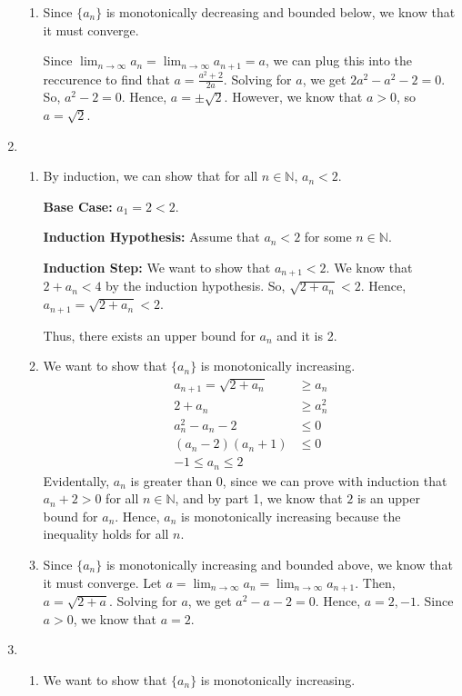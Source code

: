 \documentclass[12pt]{article}
\begin{document}
\begin{enumerate}[start=1,label={\bfseries Problem \arabic*:},leftmargin=1in]
\begin{enumerate}
        \item Since $\{ a_{n} \}$ is monotonically decreasing and bounded below, we know that it must converge. 
       
        Since $\lim_{n \to \infty} a_{n} = \lim_{n \to \infty} a_{n+1} = a$, we can plug this into the reccurence to find that $a = \frac{a^2+2}{2a}$. Solving for $a$, 
        we get $2a^{2} - a^{2} -2 = 0$. So, $a^{2} - 2 = 0$. Hence, $a = \pm \sqrt{2}$. However, we know that $a>0$, so $a = \sqrt{2}$.
    \end{enumerate}
    \item \begin{enumerate}
        \item By induction, we can show that for all $n \in \mathbb{N}$, $a_{n} < 2$. 
        
        \textbf{Base Case:} $a_{1} = 2 < 2$.

        \textbf{Induction Hypothesis:} Assume that $a_{n} < 2$ for some $n \in \mathbb{N}$.

        \textbf{Induction Step:} We want to show that $a_{n+1} < 2$. 
        We know that $2 + a_{n} < 4$ by the induction hypothesis. So, $\sqrt{2 + a_{n}} < 2$. 
        Hence, $a_{n+1} = \sqrt{2 + a_{n}} < 2$.

        Thus, there exists an upper bound for $a_{n}$ and it is 2.
        \item We want to show that $\{a_{n}\}$ is monotonically increasing. 
        \begin{align*}
            a_{n+1} = \sqrt{2 + a_{n}} &\geq a_{n}\\
            2 + a_{n} &\geq a_{n}^{2}\\
            a_{n}^{2} - a_{n} - 2 &\leq 0\\
            (a_{n} - 2)(a_{n} + 1) &\leq 0\\
            -1 \leq a_{n} \leq 2
        \end{align*}
        Evidentally, $a_{n}$ is greater than 0, since we can prove with induction that $a_{n} + 2 > 0$ for all $n \in \mathbb{N}$,
        and by part 1, we know that $2$ is an upper bound for $a_{n}$. Hence, $a_{n}$ is monotonically increasing because the inequality holds for all $n$. 

        \item Since $\{a_{n}\}$ is monotonically increasing and bounded above, we know that it must converge.
        Let $a = \lim_{n \to \infty} a_{n} = \lim_{n \to \infty} a_{n+1}$. Then, $a = \sqrt{2 + a}$. Solving for $a$, we get $a^{2} - a - 2 = 0$. Hence, $a = 2, -1$. Since $a > 0$, we know that $a = 2$.
    \end{enumerate}
    \item 
    \begin{enumerate}
        \item We want to show that $\{a_{n}\}$ is monotonically increasing.
    

\end{enumerate}
\end{enumerate}
\end{document}

